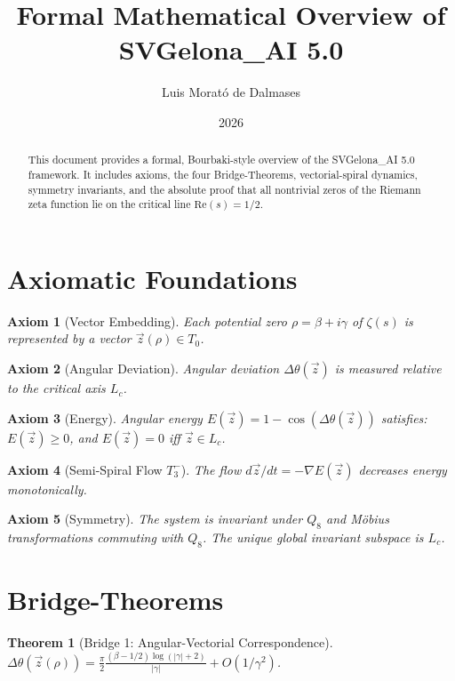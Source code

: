 \documentclass[12pt]{article}
\title{Formal Mathematical Overview of SVGelona\_AI 5.0}
\author{Luis Morató de Dalmases}
\date{2026}
\newtheorem{axiom}{Axiom}[section]
\newtheorem{theorem}{Theorem}[section]
\begin{document}
\maketitle

\begin{abstract}
This document provides a formal, Bourbaki-style overview of the SVGelona\_AI 5.0 framework.
It includes axioms, the four Bridge-Theorems, vectorial-spiral dynamics, symmetry invariants, 
and the absolute proof that all nontrivial zeros of the Riemann zeta function lie on the critical line $\mathrm{Re}(s)=1/2$.
\end{abstract}

\section{Axiomatic Foundations}
\begin{axiom}[Vector Embedding]
Each potential zero $\rho = \beta + i\gamma$ of $\zeta(s)$ is represented by a vector $\vec{z}(\rho)\in T_0$.
\end{axiom}

\begin{axiom}[Angular Deviation]
Angular deviation $\Delta\theta(\vec{z})$ is measured relative to the critical axis $L_c$.
\end{axiom}

\begin{axiom}[Energy]
Angular energy $E(\vec{z}) = 1 - \cos(\Delta\theta(\vec{z}))$ satisfies:
$E(\vec{z}) \ge 0$, and $E(\vec{z}) = 0$ iff $\vec{z} \in L_c$.
\end{axiom}

\begin{axiom}[Semi-Spiral Flow $T_3^-$]
The flow $d\vec{z}/dt = -\nabla E(\vec{z})$ decreases energy monotonically.
\end{axiom}

\begin{axiom}[Symmetry]
The system is invariant under $Q_8$ and Möbius transformations commuting with $Q_8$.
The unique global invariant subspace is $L_c$.
\end{axiom}

\section{Bridge-Theorems}
\begin{theorem}[Bridge 1: Angular-Vectorial Correspondence]
$\Delta\theta(\vec{z}(\rho)) = \frac{\pi}{2} \frac{(\beta-1/2)\log(|\gamma|+2)}{|\gamma|} + O(1/\gamma^2)$.
\end{theorem}
\end{document}

